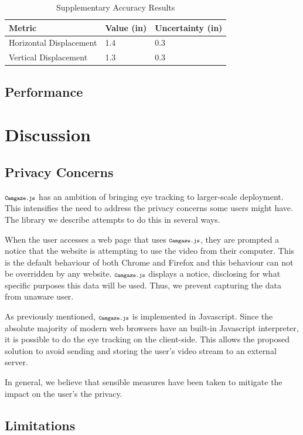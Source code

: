 \documentclass[annual]{acmsiggraph}
\newcommand{\Acronym}[1]{\ensuremath{{\small{\texttt{#1}}}}}
\newcommand{\Name}{\Acronym{Camgaze.js}} \newcommand{\False}{\Constant{false}}
\newcommand{\Constant}[1]{\ensuremath{\small{\texttt{#1}}}}
\begin{document}
\begin{table} \caption{Supplementary Accuracy Results} \begin{tabular}{l|l|l}
\textbf{Metric}                        & \textbf{Value} (in) &
\textbf{Uncertainty} (in) \\ \hline Horizontal Displacement & 1.4 & 0.3 \\
Vertical Displacement         & 1.3 & 0.3 \\ \end{tabular} \end{table}

\subsection{Performance}

\section{Discussion}

\subsection{Privacy Concerns}

$\Name$ has an ambition of bringing eye tracking to larger-scale deployment.
This intensifies the need to address the privacy concerns some users might
have. The library we describe attempts to do this in several ways.

When the user accesses a web page that uses $\Name$, they are prompted a
notice that the website is attempting to use the video from their computer.
This is the default behaviour of both Chrome and Firefox and this behaviour can
not be overridden by any website. $\Name$ displays a notice, disclosing for
what specific purposes this data will be used. Thus, we prevent capturing the
data from unaware user.

As previously mentioned, $\Name$ is implemented in Javascript. Since the
absolute majority of modern web browsers have an built-in Javascript
interpreter, it is possible to do the eye tracking on the client-side. This
allows the proposed solution to avoid sending and storing the user’s video
stream to an external server.

In general, we believe that sensible measures have been taken to mitigate the
impact on the user’s the privacy.

\subsection{Limitations}
\end{document}
